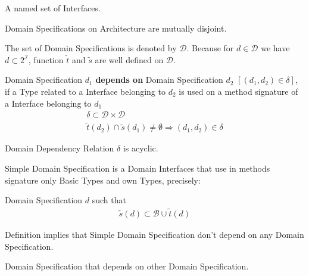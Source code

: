 \begin{defi}
  A named set of Interfaces.
\end{defi}

\begin{zalozenie}
 \item Domain Specifications on Architecture are mutually disjoint.
\end{zalozenie}


The set of Domain Specifications is denoted by $\mathcal{D}$. Because for $d \in \mathcal{D}$ we have $d \subset 2^\mathcal{I}$, function $\tilde{t}$ and $\tilde{s}$ are well defined on $\mathcal{D}$.

\begin{defi}
  Domain Specification $d_1$ \textbf{depends on} Domain Specification $d_2$ $[(d_1,d_2)\in \delta]$, if a Type related to a Interface belonging to $d_2$ is used on a method signature of a Interface belonging to $d_1$
\begin{eqnarray}
 &\delta \subset \mathcal{D} \times \mathcal{D} &\\
&\tilde{t}(d_2) \cap \tilde{s}(d_1) \neq \emptyset  \Rightarrow (d_1,d_2) \in \delta  &\nonumber
\end{eqnarray}
\end{defi}

\begin{zalozenie}
 \item Domain Dependency Relation $\delta$ is acyclic.
\end{zalozenie}

Simple Domain Specification is a Domain Interfaces that use in methods signature only Basic Types and own Types, precisely:
\begin{defi}
  Domain Specification $d$ such that
\begin{eqnarray}
\tilde{s}(d) \subset \mathcal{B} \cup \tilde{t}(d)
\end{eqnarray}
\end{defi}

Definition implies that Simple Domain Specification don't depend on any Domain Specification.

\begin{defi}
  Domain Specification that depends on other Domain Specification.
\end{defi}

